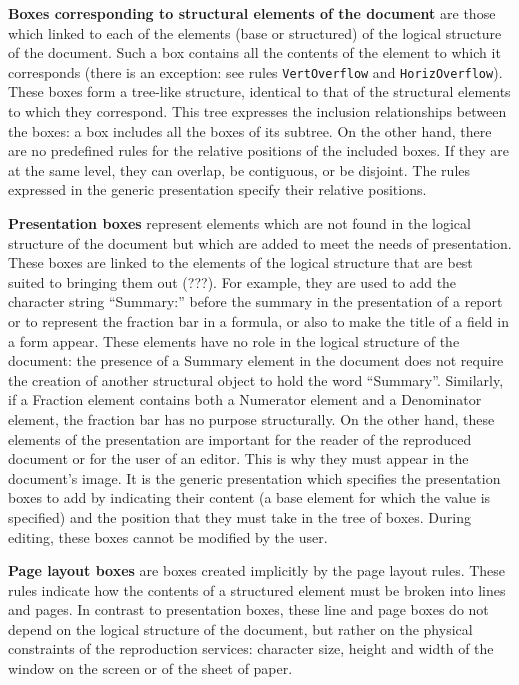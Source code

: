 {\bf Boxes corresponding to structural elements of the document} are
those which linked to each of the elements (base or structured) of
the logical structure of the document.  Such a box contains all the
contents of the element to which it corresponds (there is an exception:
see rules {\tt VertOverflow} and {\tt HorizOverflow}).  These boxes form a
tree-like structure, identical to that of the structural elements to
which they correspond.  This tree expresses the inclusion relationships
between the boxes: a box includes all the boxes of its subtree.  On
the other hand, there are no predefined rules for the relative
positions of the included boxes.  If they are at the same level, they
can overlap, be contiguous, or be disjoint.  The rules expressed in
the generic presentation specify their relative positions.

{\bf Presentation boxes} represent elements which are not found in the
logical structure of the document but which are added to meet the
needs of presentation.  These boxes are linked to the elements of the
logical structure that are best suited to bringing them out (???).
For example, they are used to add the character string ``Summary:''
before the summary in the presentation of a report or to represent the
fraction bar in a formula, or also to make the title of a field in a
form appear.  These elements have no role in the logical structure of
the document: the presence of a Summary element in the document does
not require the creation of another structural object to hold the word
``Summary''. Similarly, if a Fraction element contains both a
Numerator element and a Denominator element, the fraction bar has no
purpose structurally.  On the other hand, these elements of the
presentation are important for the reader of the reproduced document
or for the user of an editor.  This is why they must appear in the
document's image.  It is the generic presentation which specifies the
presentation boxes to add by indicating their content (a base element
for which the value is specified) and the position that they must take
in the tree of boxes.  During editing, these boxes cannot be modified
by the user.

{\bf Page layout boxes} are boxes created implicitly by the page
layout rules.  These rules indicate how the contents of a structured
element must be broken into lines and pages.  In contrast to
presentation boxes, these line and page boxes do not depend on the
logical structure of the document, but rather on the physical
constraints of the reproduction services: character size, height and
width of the window on the screen or of the sheet of paper.

